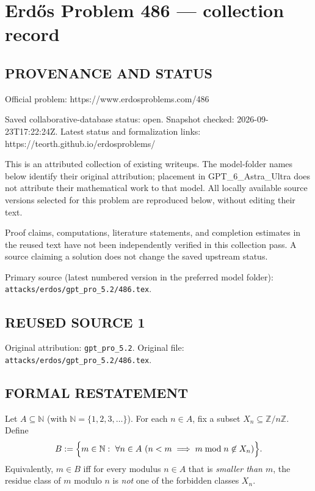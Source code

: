 \section*{Erd\H{o}s Problem 486 --- collection record}

\subsection*{PROVENANCE AND STATUS}
Official problem: https://www.erdosproblems.com/486

Saved collaborative-database status: open.
Snapshot checked: 2026-09-23T17:22:24Z.
Latest status and formalization links: https://teorth.github.io/erdosproblems/

This is an attributed collection of existing writeups. The model-folder names below identify their original attribution; placement in GPT\_6\_Astra\_Ultra does not attribute their mathematical work to that model. All locally available source versions selected for this problem are reproduced below, without editing their text.

Proof claims, computations, literature statements, and completion estimates in the reused text have not been independently verified in this collection pass. A source claiming a solution does not change the saved upstream status.

Primary source (latest numbered version in the preferred model folder): \texttt{attacks/erdos/gpt\_pro\_5.2/486.tex}.

\subsection*{REUSED SOURCE 1}
Original attribution: \texttt{gpt\_pro\_5.2}.
Original file: \texttt{attacks/erdos/gpt\_pro\_5.2/486.tex}.


\subsection*{FORMAL RESTATEMENT}
Let $A\subseteq\mathbb{N}$ (with $\mathbb{N}=\{1,2,3,\dots\}$). For each $n\in A$, fix a subset $X_n\subseteq \mathbb{Z}/n\mathbb{Z}$.
Define
\[
B := \Bigl\{ m\in\mathbb{N}:\ \forall n\in A\ (n<m\implies m\bmod n\not\in X_n)\Bigr\}.
\]
Equivalently, $m\in B$ iff for every modulus $n\in A$ that is \emph{smaller than $m$}, the residue class of $m$ modulo $n$ is \emph{not} one of the forbidden classes $X_n$.

